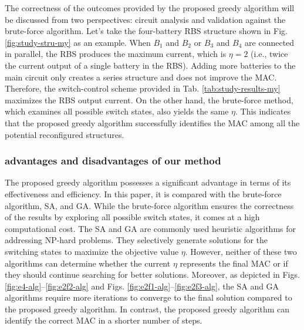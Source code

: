 \documentclass{article}
\begin{document}
The correctness of the outcomes provided by the proposed greedy algorithm will be discussed from two perspectives: circuit analysis and validation against the brute-force algorithm. 
Let's take the four-battery RBS structure shown in Fig. \ref{fig:study-stru-my} as an example.
When $B_1$ and $B_2$ or $B_3$ and $B_4$ are connected in parallel, the RBS produces the maximum current, which is $\eta=2$ (i.e., twice the current output of a single battery in the RBS). 
Adding more batteries to the main circuit only creates a series structure and does not improve the MAC. 
Therefore, the switch-control scheme provided in Tab. \ref{tab:study-results-my} maximizes the RBS output current.
On the other hand, the brute-force method, which examines all possible switch states, also yields the same $\eta$.
This indicates that the proposed greedy algorithm successfully identifies the MAC among all the potential reconfigured structures.

\subsubsection{advantages and disadvantages of our method}

The proposed greedy algorithm possesses a significant advantage in terms of its effectiveness and efficiency. 
In this paper, it is compared with the brute-force algorithm, SA, and GA. 
While the brute-force algorithm ensures the correctness of the results by exploring all possible switch states, it comes at a high computational cost. 
The SA and GA are commonly used heuristic algorithms for addressing NP-hard problems. 
They selectively generate solutions for the switching states to maximize the objective value $\eta$.
However, neither of these two algorithms can determine whether the current $\eta$ represents the final MAC or if they should continue searching for better solutions. 
Moreover, as depicted in Figs. \ref{fig:e4-alg}--\ref{fig:e2f2-alg} and Figs. \ref{fig:e2f1-alg}--\ref{fig:e2f3-alg}, the SA and GA algorithms require more iterations to converge to the final solution compared to the proposed greedy algorithm. 
In contrast, the proposed greedy algorithm can identify the correct MAC in a shorter number of steps.
\end{document}
